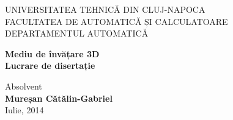 \documentclass[12pt,a4paper,twoside]{report}
\begin{document}
\begin{titlepage}
\begin{center}
UNIVERSITATEA TEHNICĂ DIN CLUJ-NAPOCA\\
FACULTATEA DE AUTOMATICĂ ȘI CALCULATOARE\\
DEPARTAMENTUL AUTOMATICĂ\\

\vspace{6cm}

\Huge {\textbf{Mediu de învățare 3D}\\}
\vspace {1cm}
\Large \textbf{Lucrare de disertație}\\

\vspace{2cm}

\large Absolvent \\ \textbf{Mureșan Cătălin-Gabriel}\\

Iulie, 2014\\
\end{center}
\end{titlepage}

\begin{titlepage}
\phantom{1}
\end{titlepage}
\end{document}
